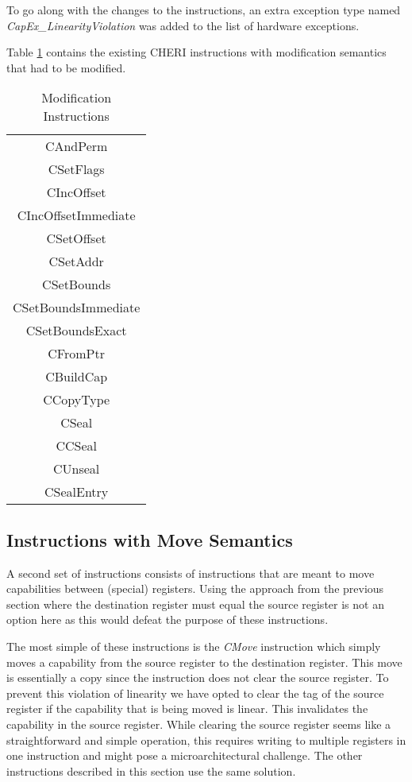 To go along with the changes to the instructions, an extra exception type named \textit{CapEx\_LinearityViolation} was added to the list of hardware exceptions.

Table \ref{table:linearitymodification} contains the existing CHERI instructions with modification semantics that had to be modified.

\begin{table}[h]
\centering
\begin{tabular}{| c |}
\hline
 CAndPerm \\
 CSetFlags \\
 CIncOffset \\
 CIncOffsetImmediate \\
 CSetOffset \\
 CSetAddr \\
 CSetBounds \\
 CSetBoundsImmediate \\
 CSetBoundsExact \\
 CFromPtr \\
 CBuildCap \\
 CCopyType \\
 CSeal \\
 CCSeal \\
 CUnseal \\
 CSealEntry \\
\hline
\end{tabular}
\caption{Modification Instructions}
\label{table:linearitymodification}
\end{table}

\subsection{Instructions with Move Semantics}
A second set of instructions consists of instructions that are meant to move capabilities between (special) registers. Using the approach from the previous section where the destination register must equal the source register is not an option here as this would defeat the purpose of these instructions.

The most simple of these instructions is the \textit{CMove} instruction which simply moves a capability from the source register to the destination register. This move is essentially a copy since the instruction does not clear the source register. To prevent this violation of linearity we have opted to clear the tag of the source register if the capability that is being moved is linear. This invalidates the capability in the source register. While clearing the source register seems like a straightforward and simple operation, this requires writing to multiple registers in one instruction and might pose a microarchitectural challenge. The other instructions described in this section use the same solution.

